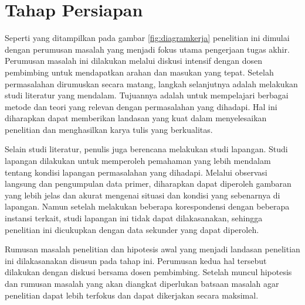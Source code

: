 \section{Tahap Persiapan}
\label{sec:tahap-persiapan}
Seperti yang ditampilkan pada gambar \ref{fig:diagramkerja} penelitian ini dimulai dengan perumusan masalah yang menjadi fokus utama pengerjaan tugas akhir. Perumusan masalah ini dilakukan melalui diskusi intensif dengan dosen pembimbing untuk mendapatkan arahan dan masukan yang tepat. Setelah permasalahan dirumuskan secara matang, langkah selanjutnya adalah melakukan studi literatur yang mendalam. Tujuannya adalah untuk mempelajari berbagai metode dan teori yang relevan dengan permasalahan yang dihadapi. Hal ini diharapkan dapat memberikan landasan yang kuat dalam menyelesaikan penelitian dan menghasilkan karya tulis yang berkualitas.
    
Selain studi literatur, penulis juga berencana melakukan studi lapangan. Studi lapangan dilakukan untuk memperoleh pemahaman yang lebih mendalam tentang kondisi lapangan permasalahan yang dihadapi. Melalui observasi langsung dan pengumpulan data primer, diharapkan dapat diperoleh gambaran yang lebih jelas dan akurat mengenai situasi dan kondisi yang sebenarnya di lapangan. Namun setelah melakukan beberapa korespondensi dengan beberapa instansi terkait, studi lapangan ini tidak dapat dilakasanakan, sehingga penelitian ini dicukupkan dengan data sekunder yang dapat diperoleh.

Rumusan masalah penelitian dan hipotesis awal yang menjadi landasan penelitian ini dilakasanakan disusun pada tahap ini. Perumusan kedua hal tersebut dilakukan dengan diskusi bersama dosen pembimbing. Setelah muncul hipotesis dan rumusan masalah yang akan diangkat diperlukan batsaan masalah agar penelitian dapat lebih terfokus dan dapat dikerjakan secara maksimal.